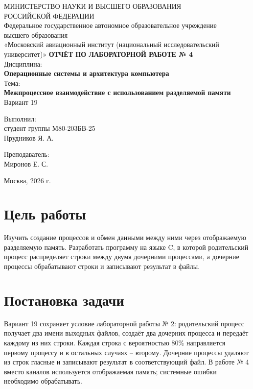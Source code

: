 \documentclass[12pt,a4paper]{article}
\begin{document}
\begin{titlepage}
\begin{center}
{\small МИНИСТЕРСТВО НАУКИ И ВЫСШЕГО ОБРАЗОВАНИЯ\\РОССИЙСКОЙ ФЕДЕРАЦИИ}\\[4mm]
{\small Федеральное государственное автономное образовательное учреждение\\ высшего образования\\ «Московский авиационный институт (национальный исследовательский университет)»}
\vfill
{\bfseries\large ОТЧЁТ ПО ЛАБОРАТОРНОЙ РАБОТЕ № 4}\\[9mm]
Дисциплина:\\[2mm]
{\bfseries Операционные системы и архитектура компьютера}\\[6mm]
Тема:\\[2mm]
{\bfseries Межпроцессное взаимодействие с использованием разделяемой памяти}\\[3mm]
Вариант 19
\vfill
\end{center}
\begin{flushright}\begin{minipage}{0.45\textwidth}
Выполнил:\\ студент группы М80-203БВ-25\\ Прудников Я. А.\par\vspace{7mm}
Преподаватель:\\ Миронов Е. С.
\end{minipage}\end{flushright}
\vfill\begin{center}Москва, 2026 г.\end{center}
\end{titlepage}
\section{Цель работы}
Изучить создание процессов и обмен данными между ними через отображаемую разделяемую память. Разработать программу на языке C, в которой родительский процесс распределяет строки между двумя дочерними процессами, а дочерние процессы обрабатывают строки и записывают результат в файлы.
\section{Постановка задачи}
Вариант 19 сохраняет условие лабораторной работы № 2: родительский процесс получает два имени выходных файлов, создаёт два дочерних процесса и передаёт каждому из них строки. Каждая строка с вероятностью 80\% направляется первому процессу и в остальных случаях -- второму. Дочерние процессы удаляют из строк гласные и записывают результат в соответствующий файл. В работе № 4 вместо каналов используется отображаемая память; системные ошибки необходимо обрабатывать.
\end{document}
